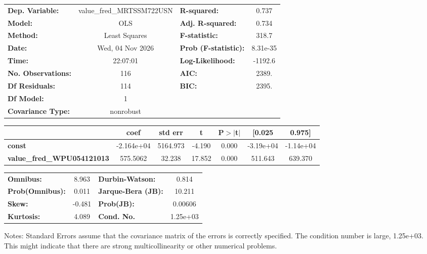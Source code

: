 \begin{center}
\begin{tabular}{lclc}
\toprule
\textbf{Dep. Variable:}            & value\_fred\_MRTSSM722USN & \textbf{  R-squared:         } &     0.737   \\
\textbf{Model:}                    &            OLS            & \textbf{  Adj. R-squared:    } &     0.734   \\
\textbf{Method:}                   &       Least Squares       & \textbf{  F-statistic:       } &     318.7   \\
\textbf{Date:}                     &      Wed, 04 Nov 2026     & \textbf{  Prob (F-statistic):} &  8.31e-35   \\
\textbf{Time:}                     &          22:07:01         & \textbf{  Log-Likelihood:    } &   -1192.6   \\
\textbf{No. Observations:}         &              116          & \textbf{  AIC:               } &     2389.   \\
\textbf{Df Residuals:}             &              114          & \textbf{  BIC:               } &     2395.   \\
\textbf{Df Model:}                 &                1          & \textbf{                     } &             \\
\textbf{Covariance Type:}          &         nonrobust         & \textbf{                     } &             \\
\bottomrule
\end{tabular}
\begin{tabular}{lcccccc}
                                   & \textbf{coef} & \textbf{std err} & \textbf{t} & \textbf{P$> |$t$|$} & \textbf{[0.025} & \textbf{0.975]}  \\
\midrule
\textbf{const}                     &   -2.164e+04  &     5164.973     &    -4.190  &         0.000        &    -3.19e+04    &    -1.14e+04     \\
\textbf{value\_fred\_WPU054121013} &     575.5062  &       32.238     &    17.852  &         0.000        &      511.643    &      639.370     \\
\bottomrule
\end{tabular}
\begin{tabular}{lclc}
\textbf{Omnibus:}       &  8.963 & \textbf{  Durbin-Watson:     } &    0.814  \\
\textbf{Prob(Omnibus):} &  0.011 & \textbf{  Jarque-Bera (JB):  } &   10.211  \\
\textbf{Skew:}          & -0.481 & \textbf{  Prob(JB):          } &  0.00606  \\
\textbf{Kurtosis:}      &  4.089 & \textbf{  Cond. No.          } & 1.25e+03  \\
\bottomrule
\end{tabular}
\end{center}

Notes: \newline
 [1] Standard Errors assume that the covariance matrix of the errors is correctly specified. \newline
 [2] The condition number is large, 1.25e+03. This might indicate that there are \newline
 strong multicollinearity or other numerical problems.